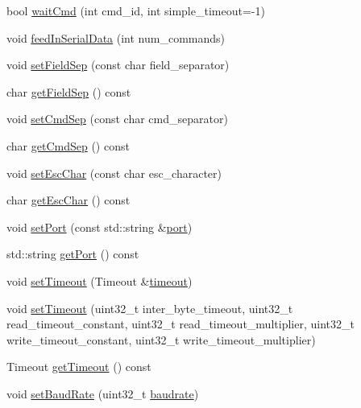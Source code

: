 \begin{DoxyCompactItemize}
\item 
bool \hyperlink{classcmd_1_1_cmd_messenger_a40c20df2763d3af8e59a7c135a82e121}{wait\+Cmd} (int cmd\+\_\+id, int simple\+\_\+timeout=-\/1)
\item 
void \hyperlink{classcmd_1_1_cmd_messenger_a77bde87787bd2da58e1ecc523d4c1a90}{feed\+In\+Serial\+Data} (int num\+\_\+commands)
\item 
void \hyperlink{classcmd_1_1_cmd_messenger_af83fbed5873f5e517a0432438dd7c873}{set\+Field\+Sep} (const char field\+\_\+separator)
\item 
char \hyperlink{classcmd_1_1_cmd_messenger_a84895ecc82e2302891b119887944a308}{get\+Field\+Sep} () const 
\item 
void \hyperlink{classcmd_1_1_cmd_messenger_afebb6b63ae64c661b680597ef29bc879}{set\+Cmd\+Sep} (const char cmd\+\_\+separator)
\item 
char \hyperlink{classcmd_1_1_cmd_messenger_acfa9dda9411bc8943973abd5f5f6156f}{get\+Cmd\+Sep} () const 
\item 
void \hyperlink{classcmd_1_1_cmd_messenger_ada69819065773ffc3c4923517321d6e5}{set\+Esc\+Char} (const char esc\+\_\+character)
\item 
char \hyperlink{classcmd_1_1_cmd_messenger_adf36d1a1b153793d9bf33f14b26167a5}{get\+Esc\+Char} () const 
\item 
void \hyperlink{classcmd_1_1_cmd_messenger_ab95dce49fc8845498c71bae25987a923}{set\+Port} (const std\+::string \&\hyperlink{interbyte_8cpp_aae3ba4688e12d52dca80a55b5725b29d}{port})
\item 
std\+::string \hyperlink{classcmd_1_1_cmd_messenger_ab2ebaaabdfeb83decbc868b556a1ea0b}{get\+Port} () const 
\item 
void \hyperlink{classcmd_1_1_cmd_messenger_a0ccea65cba7a807bdf4c476f8db9289a}{set\+Timeout} (Timeout \&\hyperlink{interbyte_8cpp_ab5627d8d8b095c198e2523c44ca380ac}{timeout})
\item 
void \hyperlink{classcmd_1_1_cmd_messenger_a0d628c1961f8d2b96fa7081961f6a0c1}{set\+Timeout} (uint32\+\_\+t inter\+\_\+byte\+\_\+timeout, uint32\+\_\+t read\+\_\+timeout\+\_\+constant, uint32\+\_\+t read\+\_\+timeout\+\_\+multiplier, uint32\+\_\+t write\+\_\+timeout\+\_\+constant, uint32\+\_\+t write\+\_\+timeout\+\_\+multiplier)
\item 
Timeout \hyperlink{classcmd_1_1_cmd_messenger_a6b8a4f763475a9e4fbef2237f1050849}{get\+Timeout} () const 
\item 
void \hyperlink{classcmd_1_1_cmd_messenger_a0fc1bac4fc0d3494893113ade503099b}{set\+Baud\+Rate} (uint32\+\_\+t \hyperlink{interbyte_8cpp_ac4f06ea26ed6bd7ae83b92d64ac10b78}{baudrate})

\end{DoxyCompactItemize}
